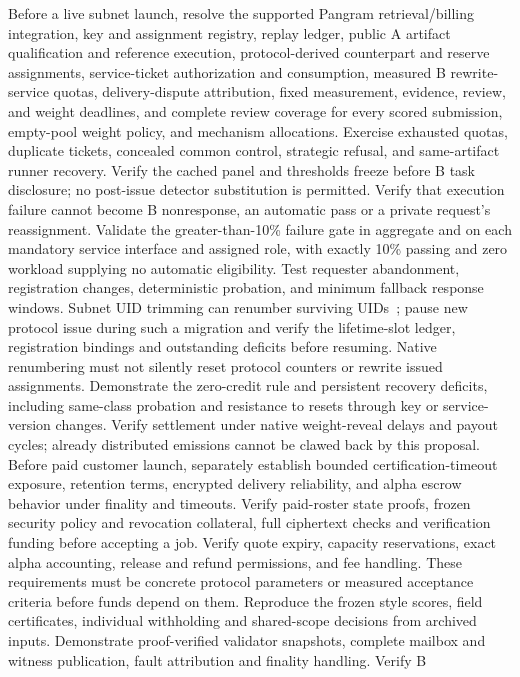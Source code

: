 Before a live subnet launch, resolve the supported Pangram
retrieval/billing integration, key and assignment registry, replay
ledger, public A artifact qualification and reference execution,
protocol-derived counterpart and reserve assignments, service-ticket authorization and
consumption, measured B rewrite-service quotas, delivery-dispute
attribution, fixed measurement, evidence, review, and weight deadlines,
and complete review coverage for every scored submission,
empty-pool weight policy, and mechanism allocations. Exercise exhausted
quotas, duplicate tickets, concealed common control, strategic refusal,
and same-artifact runner recovery. Verify the cached panel and thresholds
freeze before B task disclosure; no post-issue detector substitution is
permitted. Verify that execution failure cannot become B nonresponse,
an automatic pass or a private request's reassignment. Validate the greater-than-10\%
failure gate in aggregate and on each mandatory service interface and assigned role, with
exactly 10\% passing and zero workload supplying no automatic eligibility.
Test requester abandonment, registration changes, deterministic probation,
and minimum fallback response windows. Subnet UID trimming can renumber
surviving UIDs~\cite{mechanisms}; pause new protocol issue during such a
migration and verify the lifetime-slot ledger, registration bindings and
outstanding deficits before resuming. Native renumbering must not silently
reset protocol counters or rewrite issued assignments.
Demonstrate the zero-credit rule
and persistent recovery deficits, including same-class probation and resistance
to resets through key or service-version changes. Verify settlement
under native weight-reveal delays and payout cycles; already distributed
emissions cannot be clawed back by this proposal. Before paid customer launch, separately establish
bounded certification-timeout exposure, retention terms, encrypted delivery
reliability, and alpha escrow behavior under finality and timeouts. Verify
paid-roster state proofs, frozen security policy and revocation collateral,
full ciphertext checks and verification funding before accepting a job.
Verify quote expiry, capacity reservations, exact alpha accounting,
release and refund permissions, and fee handling. These
requirements must be concrete protocol parameters or measured acceptance
criteria before funds depend on them. Reproduce the frozen style scores,
field certificates, individual withholding and shared-scope decisions
from archived inputs.
Demonstrate proof-verified validator snapshots, complete mailbox and
witness publication, fault attribution and finality handling. Verify B
